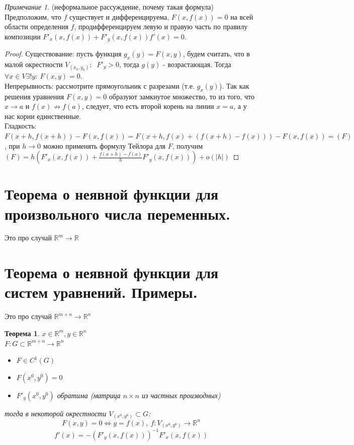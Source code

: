 \documentclass{article}
\theoremstyle{indented}
\newtheorem{theorem}{Теорема}
\theoremstyle{definition}
\theoremstyle{remark}
\newtheorem{remark}{Примечание}
\begin{document}
\begin{remark}
    (неформальное рассуждение, почему такая формула) Предположим, что $f$ существует и дифференцируема,
    $F(x,f(x))=0$ на всей области определения $f$, продифференцируем левую и правую часть по правилу композиции
    $F'_x(x,f(x))+F'_y(x,f(x)) f'(x)=0$.
\end{remark}

\begin{proof}
    Существование: пусть функция $g_x(y) = F(x,y)$, будем считать, что в малой окрестности $V_{(x_0,y_0)}: \ $ 
    $F'_y > 0$, тогда $g(y)$ - возрастающая. Тогда $\forall x \in V \exists ! y: \ F(x,y)=0$. \\
    Непрерывность: рассмотрите прямоугольник с разрезами (т.е. $g_x(y)$). Так как решения уравнения $F(x,y)=0$ образуют
    замкнутое множество, то из того, что $x \to a$ и $f(x) \not\to f(a)$, следует, что есть второй корень на линии $x=a$, а у 
    нас корни единственные. \\
    Гладкость: $F(x+h,f(x+h))-F(x,f(x))=F(x+h,f(x)+(f(x+h)-f(x)))-F(x,f(x))=(F)$, при $h\to 0$ можно применять формулу Тейлора 
    для $F$, получим $(F)=h(F'_x(x,f(x))+\frac{f(x+h)-f(x)}{h}F'_y(x,f(x)))+o(|h|)$
\end{proof}


\section{Теорема о неявной функции для произвольного числа переменных.}%


Это про случай $\mathbb{R}^m \to \mathbb{R}$


\section{Теорема о неявной функции для систем уравнений. Примеры.}%

Это про случай $\mathbb{R}^{m+n} \to \mathbb{R}^n$
\begin{theorem}
    $x\in \mathbb{R}^m , y \in \mathbb{R}^n$\\
    $F: G\subset\mathbb{R}^{m+n}\to \mathbb{R}^n$
    \begin{itemize}
        \item $F\in C^1(G)$
        \item $F(x^0,y^0)=0$
        \item $F'_y(x^0,y^0)$ обратима (матрица $n\times n$ из частных производных)
    \end{itemize}
    тогда в некоторой окрестности $V_{(x^0,y^0)} \subset G$: 
    $$F(x,y) = 0 \Leftrightarrow y=f(x), \ f: V_{(x^0,y^0)} \to \mathbb{R}^n$$
    $$f'(x) = -(F'_y(x,f(x)))^{-1} F'_x(x,f(x))$$
\end{theorem}
\end{document}
